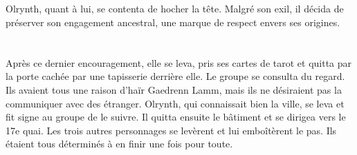 \documentclass[main.tex]{subfiles}
\begin{document}
    \\
    \\
    \\
    \\
    Olrynth, quant à lui, se contenta de hocher la tête.
    Malgré son exil, il décida de préserver son engagement ancestral, une marque de respect envers ses origines.\\
    \\
    \\
    Après ce dernier encouragement, elle se leva, pris ses cartes de tarot et quitta par la porte cachée par une tapisserie derrière elle.
    Le groupe se consulta du regard.
    Ils avaient tous une raison d'haïr Gaedrenn Lamm, mais ils ne désiraient pas la communiquer avec des étranger.
    Olrynth, qui connaissait bien la ville, se leva et fit signe au groupe de le suivre.
    Il quitta ensuite le bâtiment et se dirigea vers le 17e quai.
    Les trois autres personnages se levèrent et lui emboîtèrent le pas.
    Ils étaient tous déterminés à en finir une fois pour toute.
\end{document}
